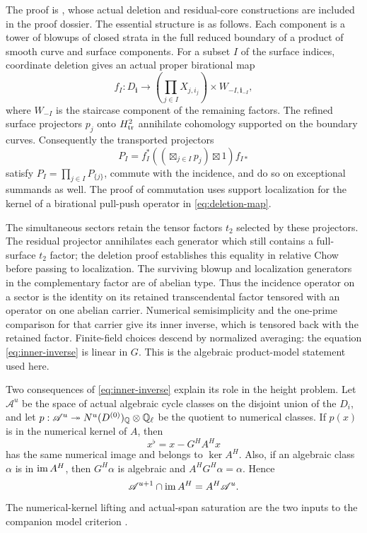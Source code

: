 The proof is \cite[model splitting theorem]{InternalProducts}, whose
actual deletion and residual-core constructions are included in the
proof dossier. The essential structure is as follows. Each component
is a tower of blowups of closed strata in the full reduced boundary
of a product of smooth curve and surface components. For a subset
$I$ of the surface indices, coordinate deletion gives an actual
proper birational map
\begin{equation}\label{eq:deletion-map}
 f_I:D_{\boldsymbol i}\longrightarrow
 \left(\prod_{j\in I}X_{j,i_j}\right)\times W_{-I,\boldsymbol i_{-I}},
\end{equation}
where $W_{-I}$ is the staircase component of the remaining factors.
The refined surface projectors $p_j$ onto $H^2_{\rm tr}$ annihilate
cohomology supported on the boundary curves. Consequently the transported
projectors
\[
 P_I=f_I^*((\boxtimes_{j\in I}p_j)\boxtimes1)f_{I*}
\]
satisfy $P_I=\prod_{j\in I}P_{\{j\}}$, commute with the incidence,
and do so on exceptional summands as well. The proof of commutation
uses support localization for the kernel of a birational pull-push
operator in \eqref{eq:deletion-map}.

The simultaneous sectors retain the tensor factors $t_2$ selected by
these projectors. The residual projector annihilates each generator
which still contains a full-surface $t_2$ factor; the deletion proof
establishes this equality in relative Chow before passing to
localization. The surviving blowup and localization generators
in the complementary factor are of abelian type. Thus the incidence
operator on a sector is the identity on its retained transcendental
factor tensored with an operator on one abelian carrier. Numerical
semisimplicity and the one-prime comparison for that carrier give its
inner inverse, which is tensored back with the retained factor.
Finite-field choices descend by normalized averaging: the equation
\eqref{eq:inner-inverse} is linear in $G$. This is the algebraic
product-model statement used here.

Two consequences of \eqref{eq:inner-inverse} explain its role in the
height problem. Let $\mathscr A^u$ be the space of actual algebraic
cycle classes on the disjoint union of the $D_i$, and let
$p:\mathscr A^u\twoheadrightarrow N^u(D^{(0)})_\mathbb Q\otimes\mathbb Q_\ell$
be the quotient to numerical classes. If $p(x)$ is in the numerical
kernel of $A$, then
\begin{equation}\label{eq:numerical-correction}
 x^\flat=x-G^HA^Hx
\end{equation}
has the same numerical image and belongs to $\ker A^H$. Also,
if an algebraic class $\alpha$ is in $\operatorname{im} A^H$, then $G^H\alpha$
is algebraic and $A^HG^H\alpha=\alpha$. Hence
\begin{equation}\label{eq:image-saturation}
 \mathscr A^{u+1}\cap\operatorname{im} A^H=A^H\mathscr A^u.
\end{equation}
The numerical-kernel lifting and actual-span saturation are the two
inputs to the companion model criterion \cite{InternalModel}.

